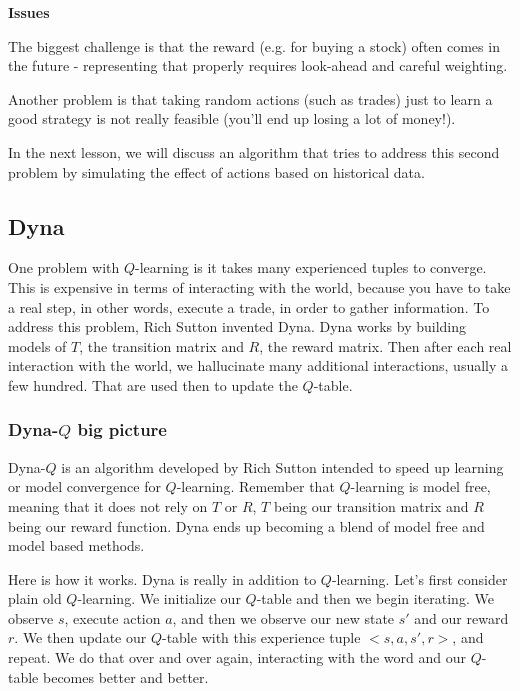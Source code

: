 \documentclass[12pt]{article}
\begin{document}
\noindent 
\textbf{Issues}

\begin{description}[font=$\bullet$\scshape\bfseries]
\item The biggest challenge is that the reward (e.g. for buying a stock) often comes in the future - representing that properly requires look-ahead and careful weighting. \\[-35pt]
\item Another problem is that taking random actions (such as trades) just to learn a good strategy is not really feasible (you'll end up losing a lot of money!). \\[-35pt]
\item In the next lesson, we will discuss an algorithm that tries to address this second problem by simulating the effect of actions based on historical data.
\end{description}

\subsection{Dyna}

One problem with $Q$-learning is it takes many experienced tuples to converge. This is expensive in terms of interacting with the world, because you have to take a real step, in other words, execute a trade, in order to gather information. To address this problem, Rich Sutton invented Dyna. Dyna works by building models of $T$, the transition matrix and $R$, the reward matrix. Then after each real interaction with the world, we hallucinate many additional interactions, usually a few hundred. That are used then to update the $Q$-table. 

\subsubsection{Dyna-$Q$ big picture}

Dyna-$Q$ is an algorithm developed by Rich Sutton intended to speed up learning or model convergence for $Q$-learning. Remember that $Q$-learning is model free, meaning that it does not rely on $T$ or $R$, $T$ being our transition matrix and $R$ being our reward function. Dyna ends up becoming a blend of model free and model based methods. 

Here is how it works. Dyna is really in addition to $Q$-learning. Let's first consider plain old $Q$-learning. We initialize our $Q$-table and then we begin iterating. We observe $s$, execute action $a$, and then we observe our new state $s'$ and our reward $r$. We then update our $Q$-table with this experience tuple $<s, a, s', r>$, and repeat. We do that over and over again, interacting with the word and our $Q$-table becomes better and better. 
\end{document}
